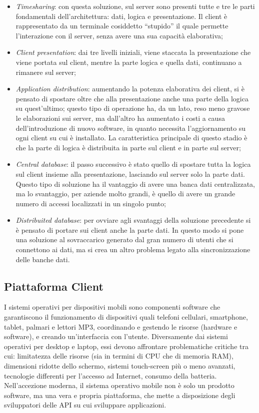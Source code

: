 \begin{itemize}
\item \emph{Timesharing}: con questa soluzione, sul server sono presenti tutte e tre le parti fondamentali dell'architettura: dati, logica e presentazione. Il client è rappresentato da un terminale cosiddetto “stupido” il quale permette l'interazione con il server, senza avere una sua capacità elaborativa;
\item \emph{Client presentation}: dai tre livelli iniziali, viene staccata la presentazione che viene portata sul client, mentre la parte logica e quella dati, continuano a rimanere sul server;
\item \emph{Application distribution}: aumentando la potenza elaborativa dei client, si è pensato di spostare oltre che alla presentazione anche una parte della logica su quest'ultimo; questo tipo di operazione ha, da un lato, reso meno gravose le elaborazioni sui server, ma dall'altro ha aumentato i costi a causa dell'introduzione di nuovo software, in quanto necessita l'aggiornamento su ogni client su cui è installato. La caratteristica principale di questo stadio è che la parte di logica è distribuita in parte sul client e in parte sul server;
\item \emph{Central database}: il passo successivo è stato quello di spostare tutta la logica sul client insieme alla presentazione, lasciando sul server solo la parte dati. Questo tipo di soluzione ha il vantaggio di avere una banca dati centralizzata, ma lo svantaggio, per aziende molto grandi, è quello di avere un grande numero di accessi localizzati in un singolo punto;
\item \emph{Distribuited database}: per ovviare agli svantaggi della soluzione precedente si è pensato di portare sui client anche la parte dati. In questo modo si pone una soluzione al sovraccarico generato dal gran numero di utenti che si connettono ai dati, ma si crea un
altro problema legato alla sincronizzazione delle banche dati.
\end{itemize}



\subsection{Piattaforma Client}

I sistemi operativi per dispositivi mobili sono componenti software che garantiscono il funzionamento di dispositivi quali telefoni cellulari, smartphone, tablet, palmari e lettori MP3, coordinando e gestendo le risorse (hardware e software), e creando un'interfaccia con l'utente.
Diversamente dai sistemi operativi per desktop e laptop, essi devono affrontare problematiche critiche tra cui: limitatezza delle risorse (sia in termini di CPU che di memoria RAM), dimensioni ridotte dello schermo, sistemi touch-screen più o meno avanzati, tecnologie differenti per l'accesso ad Internet, consumo della batteria.
Nell'accezione moderna, il sistema operativo mobile non è solo un prodotto software, ma una vera e propria piattaforma, che mette a disposizione degli sviluppatori delle API su cui sviluppare applicazioni.

